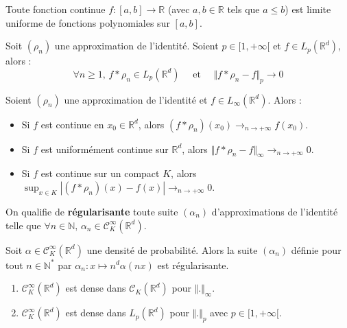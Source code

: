 
  \begin{application}
    Toute fonction continue $f : [a,b] \rightarrow \mathbb{R}$ (avec $a, b \in \mathbb{R}$ tels que $a \leq b$) est limite uniforme de fonctions polynomiales sur $[a, b]$.
  \end{application}


  \begin{theorem}
    Soit $(\rho_n)$ une approximation de l'identité. Soient $p \in [1, +\infty[$ et $f \in L_p(\mathbb{R}^d)$, alors :
    \[ \forall n \geq 1, \, f * \rho_n \in L_p(\mathbb{R}^d) \quad \text{ et } \quad \Vert f * \rho_n - f \Vert_p \longrightarrow 0 \]
  \end{theorem}

  \begin{theorem}
    Soient $(\rho_n)$ une approximation de l'identité et $f \in L_\infty(\mathbb{R}^d)$. Alors :
    \begin{itemize}
      \item Si $f$ est continue en $x_0 \in \mathbb{R}^d$, alors $(f * \rho_n)(x_0) \longrightarrow_{n \rightarrow +\infty} f(x_0)$.
      \item Si $f$ est uniformément continue sur $\mathbb{R}^d$, alors $\Vert f * \rho_n - f \Vert_\infty \longrightarrow_{n \rightarrow +\infty} 0$.
      \item Si $f$ est continue sur un compact $K$, alors $\sup_{x \in K} |(f * \rho_n)(x) - f(x)| \longrightarrow_{n \rightarrow +\infty} 0$.
    \end{itemize}
  \end{theorem}

  \begin{definition}
    On qualifie de \textbf{régularisante} toute suite $(\alpha_n)$ d'approximations de l'identité telle que $\forall n \in \mathbb{N}, \, \alpha_n \in \mathcal{C}^\infty_K(\mathbb{R}^d)$.
  \end{definition}

  \begin{example}
    Soit $\alpha \in \mathcal{C}^\infty_K(\mathbb{R}^d)$ une densité de probabilité. Alors la suite $(\alpha_n)$ définie pour tout $n \in \mathbb{N}^*$ par $\alpha_n : x \mapsto n^d \alpha(nx)$ est régularisante.
  \end{example}


  \begin{application}
    \begin{enumerate}[label={\bfseries(\roman*)}]
      \item $\mathcal{C}^\infty_K(\mathbb{R}^d)$ est dense dans $\mathcal{C}_K(\mathbb{R}^d)$ pour $\Vert . \Vert_\infty$.
      \item $\mathcal{C}^\infty_K(\mathbb{R}^d)$ est dense dans $L_p(\mathbb{R}^d)$ pour $\Vert . \Vert_p$ avec $p \in [1, +\infty[$.
    \end{enumerate}
  \end{application}

